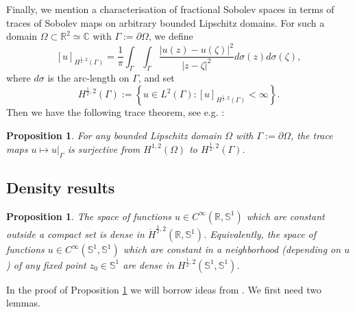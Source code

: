 \documentclass[12pt, a4paper]{article}
\newtheorem{prop}[thm]{Proposition}
\newcommand{\sph}{\mathbb{S}}
\newcommand{\R}{\mathbb{R}}
\renewcommand{\(}{\left(}
\renewcommand{\)}{\right)}
\begin{document}
Finally, we mention a characterisation of fractional Sobolev spaces in terms of traces of Sobolev maps on arbitrary bounded Lipschitz domains. For such a domain $\Omega\subset\R^2\simeq \mathbb{C}$ with $\Gamma:=\partial\Omega$, we define
$$[u]_{H^{\frac12,2}(\Gamma)}=\frac{1}{\pi}\int_\Gamma\int_\Gamma\frac{|u(z)-u(\zeta)|^2}{|z-\zeta|^2}d\sigma(z)d\sigma(\zeta),$$
where $d\sigma$ is the arc-length on $\Gamma$, and set
$$H^{\frac12,2}(\Gamma):=\left\{u\in L^2(\Gamma):[u]_{H^{\frac12,2}(\Gamma)}<\infty\right\}.$$ %
Then we have the following trace theorem, see e.g. \cite{Gagliardo,Prodi}:
\begin{prop}\label{trace}
For any bounded Lipschitz domain $\Omega$ with $\Gamma:=\partial\Omega$, the trace maps $u\mapsto u|_\Gamma$ is surjective from $H^{1,2}(\Omega)$ to $H^{\frac12,2}(\Gamma)$.
\end{prop}

 


\subsection{Density results}

\begin{prop}\label{l:approx}
The space of functions $u\in C^\infty(\R,\sph^1)$ which are constant outside a compact set is dense in $\dot H^{\frac{1}{2},2}(\R,\sph^1)$. Equivalently, the space of functions $u\in C^\infty(\sph^1,\sph^1) $  which are constant in a  neighborhood  (depending on $u$) of any fixed point $z_0\in \sph^1$ are dense in $H^{\frac{1}{2},2}(\sph^1,\sph^1)$.  
\end{prop}

In the proof of Proposition \ref{l:approx} we will borrow ideas from \cite{BN}. We first need two lemmas.
\end{document}
